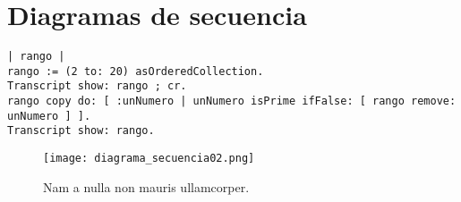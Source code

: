 \documentclass[titlepage,a4paper]{article}
\begin{document}
\section{Diagramas de secuencia}\label{sec:diagramasdesecuencia}

\begin{verbatim}
| rango |
rango := (2 to: 20) asOrderedCollection.
Transcript show: rango ; cr.
rango copy do: [ :unNumero | unNumero isPrime ifFalse: [ rango remove: unNumero ] ].
Transcript show: rango.
\end{verbatim}

\begin{figure}[H]
\centering
\texttt{[image: diagrama\_secuencia02.png]}
\caption{\label{fig:seq02}Nam a nulla non mauris ullamcorper.}
\end{figure}
\end{document}
